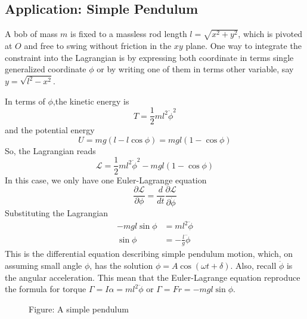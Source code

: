 \documentclass[../../../main.tex]{subfiles}
\begin{document}
\subsection*{Application: Simple Pendulum}
A bob of mass $m$ is fixed to a massless rod length $l=\sqrt{x^2+y^2}$, which is pivoted at $O$ and free to swing without friction in the $xy$ plane.
One way to integrate the constraint into the Lagrangian is by expressing both coordinate in terms single generalized coordinate $\phi$ or by writing one of them in terms other variable, say  $y=\sqrt{l^2-x^2}$.

In terms of $\phi$,the kinetic energy is 
\begin{equation*}
    T=\frac{1}{2}ml^2\dot{\phi}^2
\end{equation*}
and the potential energy 
\begin{equation*}
    U=mg(l-l\cos\phi)=mgl(1-\cos\phi)
\end{equation*}
So, the Lagrangian reads
\begin{equation*}
    \mathcal{L}=\frac{1}{2}ml^2\dot{\phi}^2-mgl(1-\cos\phi)
\end{equation*}
In this case, we only have one Euler-Lagrange equation
\begin{equation*}
    \frac{\partial\mathcal{L}}{\partial \phi}=\frac{d}{dt}\frac{\partial\mathcal{L}}{\partial \dot{\phi}}
\end{equation*}
Substituting the Lagrangian
\begin{align*}
    -mgl\sin\phi&=ml^2\ddot{\phi}\\
    \sin\phi&=-\frac{l}{g}\ddot{\phi}
\end{align*}
This is the differential equation describing simple pendulum motion, which, on assuming small angle $\phi$, has the solution $\phi=A\cos(\omega t+\delta)$. 
Also, recall $\ddot{\phi}$ is the angular acceleration. 
This mean that the Euler-Lagrange equation reproduce the formula for torque $\Gamma=I\alpha=ml^2\ddot{\phi}$ or $\Gamma=Fr=-mgl\sin\phi$. 

\begin{figure*}
	\centering
	\caption*{Figure: A simple pendulum}
\end{figure*}
\end{document}
